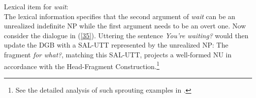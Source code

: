 \documentclass[output=paper
                ,modfonts
                ,nonflat
	        ,collection
	        ,collectionchapter
	        ,collectiontoclongg
 	        ,biblatex
                ,babelshorthands
                ,newtxmath
                ,draftmode
                ,colorlinks, citecolor=brown
]{./langsci/langscibook}
\begin{document}
{
\ea 
\label{wait}
Lexical item for \emph{wait}:\\
\z
%
The lexical information specifies that the second argument of \emph{wait} can be an unrealized indefinite NP while the first argument needs to be an overt one. Now consider the dialogue in (\ref{35}). Uttering
the sentence \emph{You're waiting?} would then update the DGB with a SAL-UTT represented by the unrealized NP:
%
\ea
{}
\z
%
The fragment \emph{for what?}, matching this SAL-UTT,
projects a well-formed NU in accordance with the Head-Fragment Construction.\footnote{See the detailed analysis of such sprouting examples in \citet{Kim2015}.}

}
\end{document}
